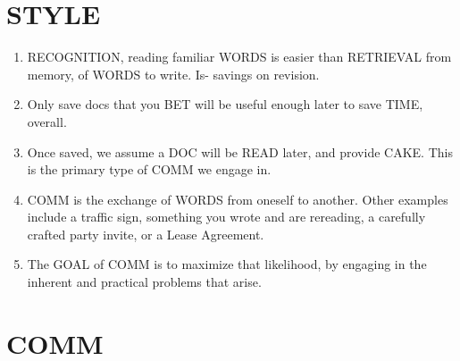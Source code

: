 \documentclass[
]{book}
\providecommand{\tightlist}{%
  \setlength{\itemsep}{0pt}\setlength{\parskip}{0pt}}
\begin{document}
\hypertarget{style}{%
\section{STYLE}\label{style}}

\begin{enumerate}
\def\labelenumi{\arabic{enumi}.}
\setcounter{enumi}{11}
\tightlist
\item
  RECOGNITION, reading familiar WORDS is easier than RETRIEVAL from
  memory, of WORDS to write. Is- savings on revision.
\item
  Only save docs that you BET will be useful enough later to save
  TIME, overall.
\item
  Once saved, we assume a DOC will be READ later, and provide CAKE.
  This is the primary type of COMM we engage in.
\item
  COMM is the exchange of WORDS from oneself to another. Other
  examples include a traffic sign, something you wrote and are
  rereading, a carefully crafted party invite, or a Lease Agreement.
\item
  The GOAL of COMM is to maximize that likelihood, by engaging in the
  inherent and practical problems that arise.
\end{enumerate}

\hypertarget{comm}{%
\section{COMM}\label{comm}}
\end{document}
